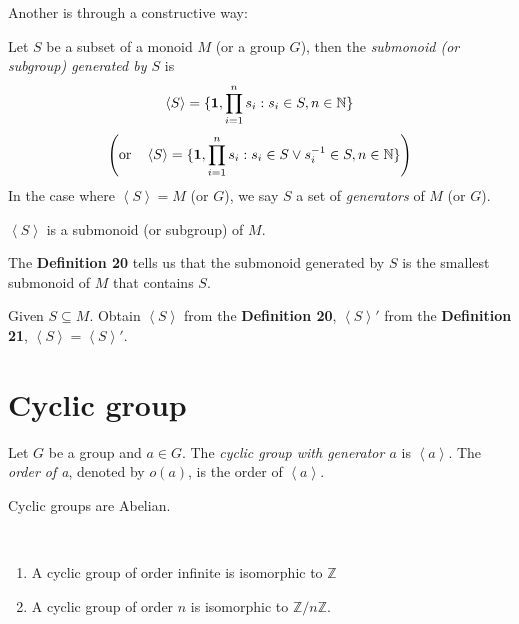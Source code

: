Another is through a constructive way:
\begin{definition}[Generator]
Let $S$ be a subset of a monoid $M$ (or a group $G$), then the \textit{submonoid (or subgroup) generated by $S$} is
$$
\left<S \right> = \{ \mathbf{1}, \prod_{i=1}^{n}s_i :s_i \in S, n \in \mathbb{N}  \}
$$
$$
\left(\text{or} \quad  \left<S \right> = \{ \mathbf{1}, \prod_{i=1}^{n}s_i :s_i \in S \lor s_i^{-1} \in S, n \in \mathbb{N}  \} \right)
$$
In the case where $\left<S \right> = M$ (or $G$), we say $S$ a set of \textit{generators} of $M$ (or $G$).
\end{definition}

\begin{remark}
$\left<S \right>$ is a submonoid (or subgroup) of $M$.
\end{remark}




The \textbf{Definition 20} tells us that the submonoid generated by $S$ is the smallest submonoid of $M$ that contains $S$.
\begin{prop}
Given $S \subseteq M$. Obtain $\left<S \right>$ from the \textbf{Definition 20}, $\left<S \right>'$ from the \textbf{Definition 21}, $\left<S \right> = \left<S \right>'$.
\end{prop}


\newpage

\section{Cyclic group} \label{sec:}

\begin{definition}
Let $G$ be a group and $a \in G$. The \textit{cyclic group with generator $a$} is $\left<a \right>$.
The \textit{order of a}, denoted by $o(a)$, is the order of $\left<a \right>$.
\end{definition}

\begin{remark}
Cyclic groups are Abelian.
\end{remark}



\begin{lemma} ~
\begin{enumerate}
    \item A cyclic group of order infinite is isomorphic to $\mathbb{Z}$
    \item A cyclic group of order $n$ is isomorphic to $\mathbb{Z}/n\mathbb{Z}$.
\end{enumerate}
\end{lemma}

